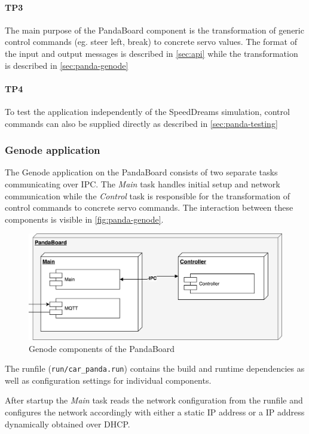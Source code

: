 \paragraph{\textbf{TP3}} The main purpose of the PandaBoard component is the transformation of generic control commands (eg. steer left, break) to concrete servo values. The format of the input and output messages is described in \autoref{sec:api} while the transformation is described in \autoref{sec:panda-genode}

\paragraph{\textbf{TP4}} To test the application independently of the SpeedDreams simulation, control commands can also be supplied directly as described in \autoref{sec:panda-testing}


\subsubsection{Genode application}
\label{sec:panda-genode}
The Genode application on the PandaBoard consists of two separate tasks communicating over IPC. The \textit{Main} task handles initial setup and network communication while the \textit{Control} task is responsible for the transformation of control commands to concrete servo commands. The interaction between these components is visible in \autoref{fig:panda-genode}.

\begin{figure}[h]
    \centering
    \includegraphics[width=0.7\linewidth]{images/comp_panda}
    \caption{Genode components of the PandaBoard}
    \label{fig:panda-genode}
\end{figure}

The runfile (\texttt{run/car\_panda.run}) contains the build and runtime dependencies as well as configuration settings for individual components.

After startup the \textit{Main} task reads the network configuration from the runfile and configures the network accordingly with either a static IP address or a IP address dynamically obtained over DHCP.

